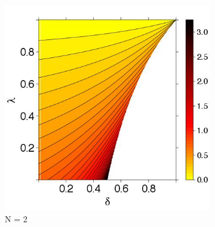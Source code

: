 \documentclass[11pt,twoside]{article}
\theoremstyle{definition}
\theoremstyle{definition}
\begin{document}
\begin{figure}
        \centering
        \begin{subfigure}[b]{0.45\textwidth}
                \includegraphics[width=\textwidth]{ExtremeN2.jpeg}
\caption{N = 2}	
\label{ExtremeN5}
        \end{subfigure}%
        ~ %
        ~ %
        \begin{subfigure}[b]{0.45\textwidth}

\end{subfigure}
\end{figure}
\end{document}
